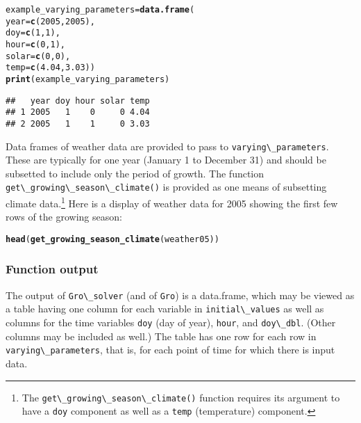 \documentclass{article}\usepackage[]{graphicx}\usepackage[]{color}
\makeatletter
\newcommand{\hlnum}[1]{\textcolor[rgb]{0.686,0.059,0.569}{#1}}%
\newcommand{\hlstd}[1]{\textcolor[rgb]{0.345,0.345,0.345}{#1}}%
\newcommand{\hlkwb}[1]{\textcolor[rgb]{0.69,0.353,0.396}{#1}}%
\newcommand{\hlkwc}[1]{\textcolor[rgb]{0.333,0.667,0.333}{#1}}%
\newcommand{\hlkwd}[1]{\textcolor[rgb]{0.737,0.353,0.396}{\textbf{#1}}}%
\newenvironment{kframe}{%
 \def\at@end@of@kframe{}%
 \ifinner\ifhmode%
  \def\at@end@of@kframe{\end{minipage}}%
  \begin{minipage}{\columnwidth}%
 \fi\fi%
 \def\FrameCommand##1{\hskip\@totalleftmargin \hskip-\fboxsep
 \colorbox{shadecolor}{##1}\hskip-\fboxsep
     \hskip-\linewidth \hskip-\@totalleftmargin \hskip\columnwidth}%
 \MakeFramed {\advance\hsize-\width
   \@totalleftmargin\z@ \linewidth\hsize
   \@setminipage}}%
 {\par\unskip\endMakeFramed%
 \at@end@of@kframe}
\newenvironment{knitrout}{}{} %
\newcommand{\code}[1]{\lstinline[style=C++style]{#1}}
\makeatother
\begin{document}
\begin{knitrout}
\color{fgcolor}\begin{kframe}
\begin{alltt}
\hlstd{example_varying_parameters} \hlkwb{=} \hlkwd{data.frame}\hlstd{(}
            \hlkwc{year} \hlstd{=} \hlkwd{c}\hlstd{(}\hlnum{2005}\hlstd{,} \hlnum{2005}\hlstd{),}
            \hlkwc{doy} \hlstd{=} \hlkwd{c}\hlstd{(}\hlnum{1}\hlstd{,} \hlnum{1}\hlstd{),}
            \hlkwc{hour} \hlstd{=} \hlkwd{c}\hlstd{(}\hlnum{0}\hlstd{,} \hlnum{1}\hlstd{),}
            \hlkwc{solar} \hlstd{=} \hlkwd{c}\hlstd{(}\hlnum{0}\hlstd{,} \hlnum{0}\hlstd{),}
            \hlkwc{temp} \hlstd{=} \hlkwd{c}\hlstd{(}\hlnum{4.04}\hlstd{,} \hlnum{3.03}\hlstd{))}
\hlkwd{print}\hlstd{(example_varying_parameters)}
\end{alltt}
\begin{verbatim}
##   year doy hour solar temp
## 1 2005   1    0     0 4.04
## 2 2005   1    1     0 3.03
\end{verbatim}
\end{kframe}
\end{knitrout}

Data frames of weather data are provided to pass to
\code{varying\_parameters}. These are typically for one year (January
1 to December 31) and should be subsetted to include only the period
of growth.  The function \code{get\_growing\_season\_climate()} is
provided as one means of subsetting climate data.\footnote{The
  \code{get\_growing\_season\_climate()} function requires its
  argument to have a \code{doy} component as well as a \code{temp}
  (temperature) component.}  Here is a display of weather data for
2005 showing the first few rows of the growing season:

\begin{knitrout}
\color{fgcolor}\begin{kframe}
\begin{alltt}
\hlkwd{head}\hlstd{(}\hlkwd{get_growing_season_climate}\hlstd{(weather05))}
\end{alltt}


{\ttfamily\noindent\bfseries{}}\end{kframe}
\end{knitrout}

\subsubsection{Function output}
The output of \code{Gro\_solver} (and of \code{Gro}) is a data.frame,
which may be viewed as a table having one column for each variable in
\code{initial\_values} as well as columns for the time variables
\code{doy} (day of year), \code{hour}, and \code{doy\_dbl}.  (Other
columns may be included as well.)  The table has one row for each row
in \code{varying\_parameters}, that is, for each point of time for
which there is input data.
\end{document}
